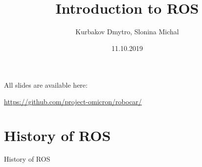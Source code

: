 \documentclass{beamer}
\begin{document}
\title{Introduction to ROS} 
\author{Kurbakov Dmytro, Slonina Michal}

\date{11.10.2019}

\begin{frame}
\titlepage
\end{frame}

\begin{frame}
All slides are available here:

\url{https://github.com/project-omicron/robocar/}
\end{frame}

\section{History of ROS} 
\begin{frame}
\begin{center}
\Huge History of ROS
\end{center}
\end{frame}
\end{document}
